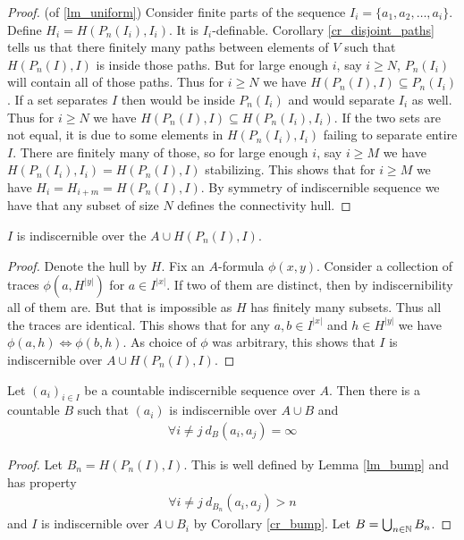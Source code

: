 \begin{proof}(of \ref{lm_uniform})
  Consider finite parts of the sequence $I_i = \{a_1, a_2, \ldots, a_i\}$.
  Define $H_i = H(P_n(I_i), I_i)$.
  It is $I_i$-definable. %
  Corollary \ref{cr_disjoint_paths} tells us that there finitely many paths between elements of $V$ such that $H(P_n(I), I)$ is inside those paths.
  But for large enough $i$, say $i \geq N$, $P_n(I_i)$ will contain all of those paths.
  Thus for $i \geq N$ we have $H(P_n(I), I) \subseteq P_n(I_i)$.
  If a set separates $I$ then would be inside $P_n(I_i)$ and would separate $I_i$ as well.
  Thus for $i \geq N$ we have $H(P_n(I), I) \subseteq H(P_n(I_i), I_i)$.
  If the two sets are not equal, it is due to some elements in $H(P_n(I_i), I_i)$ failing to separate entire $I$. There are finitely many of those, so for large enough $i$, say $i \geq M$ we have $H(P_n(I_i), I_i) = H(P_n(I), I)$ stabilizing.
  This shows that for $i \geq M$ we have $H_i = H_{i+m} = H(P_n(I), I)$. By symmetry of indiscernible sequence we have that any subset of size $N$ defines the connectivity hull.
\end{proof}

\begin{Lemma} \label{cr_bump}
  $I$ is indiscernible over the $A \cup H(P_n(I), I)$.
\end{Lemma}

\begin{proof}
  Denote the hull by $H$. Fix an $A$-formula $\phi(x,y)$. Consider a collection of traces $\phi(a, H^{|y|})$ for $a \in I^{|x|}$. If two of them are distinct, then by indiscernibility all of them are. But that is impossible as $H$ has finitely many subsets. Thus all the traces are identical. This shows that for any $a,b \in I^{|x|}$ and $h \in H^{|y|}$ we have $\phi(a, h) \iff \phi(b, h)$. As choice of $\phi$ was arbitrary, this shows that $I$ is indiscernible over $A \cup H(P_n(I), I)$.
\end{proof}

\begin{Corollary} 
  Let $(a_i)_{i \in I}$ be a countable indiscernible sequence over $A$. Then there is a countable $B$ such that  $(a_i)$ is indiscernible over $A \cup B$ and
  \begin{align*}
    \forall i \neq j \ d_B(a_i, a_j) = \infty
  \end{align*}
\end{Corollary}

\begin{proof}
  Let $B_n = H(P_n(I), I)$. This is well defined by Lemma \ref{lm_bump} and has property
  \begin{align*}
    \forall i \neq j \ d_{B_n}(a_i, a_j) > n
  \end{align*}
  and $I$ is indiscernible over $A \cup B_i$ by Corollary \ref{cr_bump}. Let $B = \bigcup_{n \in \mathbb{N}} B_n$.
\end{proof}

